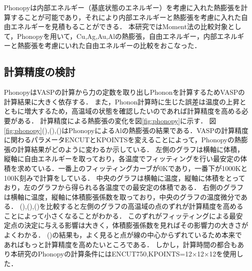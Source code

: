 Phonopyは内部エネルギー（基底状態のエネルギー）を考慮に入れた熱膨張を計算することが可能であり，それにより内部エネルギーと熱膨張を考慮に入れた自由エネルギーを見積もることができる．
本研究ではMoment法の比較対象として，Phonopyを用いて，Cu,Ag,Au,Alの熱膨張，自由エネルギー，内部エネルギーと熱膨張を考慮にいれた自由エネルギーの比較をおこなった．
\subsection{計算精度の検討}
PhonopyはVASPの計算から力の定数を取り出しPhononを計算するためVASPの計算結果に大きく依存する．
また，Phonon計算時に生じた誤差は温度の上昇とともに増大するため，高温域の状態を確認したいのであれば計算精度を高める必要がある．
計算精度による熱膨張の変化を図\ref{fig:phonopy}に示す．
図\ref{fig:phonopy}(),(),()はPhonopyによるAlの熱膨張の結果である．VASPの計算精度に関わるパラメータENCUTとKPOINTSを変えることによって，Phonopyの熱膨張の計算結果がどのように変わるか示している．
左側のグラフは横軸に体積，縦軸に自由エネルギーを取っており，各温度でフィッティングを行い最安定の体積を求めている．一番上のフィッティングカーブが0Kであり，一番下が1000Kと100K刻みで計算をしている．
中央のグラフは横軸に温度，縦軸に体積をとっており，左のグラフから得られる各温度での最安定の体積である．
右側のグラフは横軸に温度，縦軸に体積膨張係数を取っており，中央のグラフの温度微分である．
(),(),()を比較すると左側のグラフの高温域の点のずれが計算精度を高めることによって小さくなることがわかる．
このずれがフィッティングによる最安定点の決定に与える影響は大きく，体積膨張係数を見ればその影響力の大きさがよくわかる．
()の結果も，よく見ると点が線の中心からずれているため本来であればもっと計算精度を高めたいところである．
しかし，計算時間の都合もあり本研究のPhonopyの計算条件にはENCUT750,KPOINTS=12$\times$12$\times$12を使用した．


